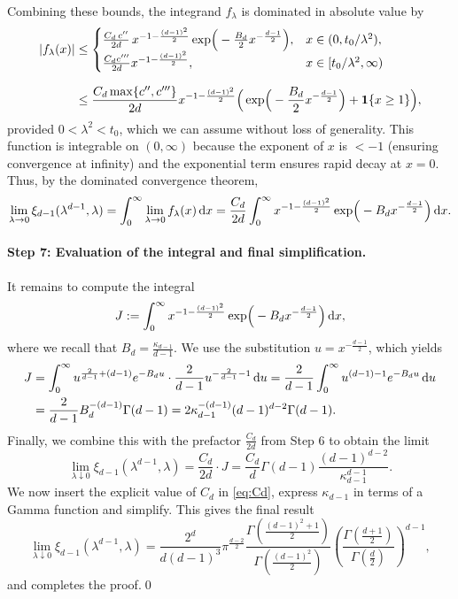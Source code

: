 \documentclass[11pt,a4paper]{article}
\theoremstyle{plain}
\theoremstyle{definition}
\theoremstyle{remark}
\newcommand{\dint}{\textup{d}}
\begin{document}
Combining these bounds, the integrand $f_\lambda$ is dominated in absolute value by
\begin{align*}
	|f_\lambda(x)| & \le \begin{cases}
		                     \frac{C_d \,c''}{2d} \, x^{-1 - \frac{(d-1)^2}{2}} \exp\!\Big( - \frac{B_d}{2} x^{-\frac{d-1}{2}} \Big), & x \in (0,t_0/\lambda^2),   \\
		                     \frac{C_d c'''}{2d} x^{-1-\frac{(d-1)^2}{2}},                                                            & x\in[t_0/\lambda^2,\infty)
	                     \end{cases} \\[0.25cm]
	               & \leq \frac{C_d\max\{c'',c'''\}}{2d} x^{-1-\frac{(d-1)^2}{2}}\Big(\exp\!\Big( - \frac{B_d}{2} x^{-\frac{d-1}{2}} \Big) + {\bf 1}\{x\geq 1\}\Big),
\end{align*}
provided $0<\lambda^2<t_0$, which we can assume without loss of generality. This function is integrable on $(0, \infty)$ because the exponent of $x$ is $<-1$ (ensuring convergence at infinity) and the exponential term ensures rapid decay at $x=0$. Thus, by the dominated convergence theorem,
\[
	\lim_{\lambda \to 0} \xi_{d-1}(\lambda^{d-1}, \lambda) = \int_0^\infty \lim_{\lambda \to 0} f_\lambda(x) \, \dint x = \frac{C_d}{2d} \int_0^\infty x^{-1 - \frac{(d-1)^2}{2}} \exp\!\Big( - B_d x^{-\frac{d-1}{2}} \Big) \, \dint x.
\]


\paragraph{Step 7: Evaluation of the integral and final simplification.}
It remains to compute the integral
\[
	J := \int_0^\infty x^{-1 - \frac{(d-1)^2}{2}} \exp\!\Big( - B_d x^{-\frac{d-1}{2}} \Big) \, \dint x,
\]
where we recall that $B_d = \frac{\kappa_{d-1}}{d-1}$. We use the substitution $u = x^{-\frac{d-1}{2}}$, which yields
\begin{align*}
	J & = \int_0^\infty u^{\frac{2}{d-1} + (d-1)} e^{-B_du} \cdot \frac{2}{d-1} u^{-\frac{2}{d-1}-1} \, \dint u
	= \frac{2}{d-1} \int_0^\infty u^{(d-1)-1} e^{-B_du} \, \dint u                                              \\
	  & = \frac{2}{d-1} B_d^{-(d-1)} \Gamma(d-1) = 2 \kappa_{d-1}^{-(d-1)} (d-1)^{d-2} \Gamma(d-1).
\end{align*}
Finally, we combine this with the prefactor $\frac{C_d}{2d}$ from Step 6 to obtain the limit
\[
	\lim_{\lambda\downarrow 0} \xi_{d-1}(\lambda^{d-1},\lambda)
	= \frac{C_d}{2d} \cdot J
	= \frac{C_d}{d} \Gamma(d-1) \frac{(d-1)^{d-2}}{\kappa_{d-1}^{d-1}}.
\]
We now insert the explicit value of $C_d$ in \eqref{eq:Cd}, express $\kappa_{d-1}$ in terms of a Gamma function and simplify. This gives the final result
\[
	\lim_{\lambda\downarrow 0} \xi_{d-1}(\lambda^{d-1},\lambda)
	= \frac{2^d}{d(d-1)^3} \pi^{\frac{d-2}{2}} \frac{\Gamma(\frac{(d-1)^2+1}{2})}{\Gamma(\frac{(d-1)^2}{2})} \left( \frac{\Gamma(\frac{d+1}{2})}{\Gamma(\frac{d}{2})} \right)^{d-1},
\]
and completes the proof.\qed
\end{document}
